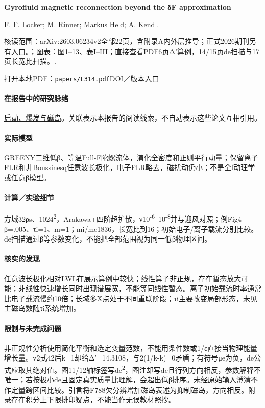 \textbf{Gyrofluid magnetic reconnection beyond the δF approximation}\citep{L314}\

F. F. Locker;  M. Rinner;  Markus Held;  A. Kendl.

\textsf{核读范围：}arXiv:2603.06234v2全部22页，含附录A内外层推导；正式2026期刊另有入口。；\textsf{图表：}图1–13、表I–III；直接查看PDF6页Δ'算例，14/15页de扫描与17页长宽比扫描。.

\href{run:papers/L314.pdf}{打开本地PDF：\texttt{papers/L314.pdf}}\quad\href{https://doi.org/10.1063/5.0332416}{DOI／版本入口}

\paragraph{在报告中的研究脉络}\hyperref[story:onset]{启动、爆发与磁岛}。关联表示本报告的阅读线索，不自动表示这些论文互相引用。

\paragraph{实际模型}GREENY二维低β、等温Full-F陀螺流体，演化全密度和正则平行动量；保留离子FLR和非Boussinesq任意波长极化，电子FLR略去，磁扰动仍小；不是全f动理学或任意β模型。

\paragraph{计算／实验细节}方域32ρs、1024\textsuperscript{2}，Arakawa+四阶超扩散，ν10\textsuperscript{-6}–10\textsuperscript{-8}并与迎风对照；例Fig4 β=.005、τi=1、m=1；mi/me1836，长宽比到16；初始电子/离子载流分别比较。de扫描通过β等参数变化，不能把全部范围视为同一低β物理区间。

\paragraph{核实的发现}任意波长极化相对LWL在展示算例中较快；线性算子非正规，存在暂态放大可能；非线性快速增长同时出现谱展宽，不能等同线性暂态。离子初始载流时率通常比电子载流慢约10倍；长域多X点处于不同重联阶段；τi主要改变局部形态，未见主磁岛数随τi系统增加。

\paragraph{限制与未完成问题}非正规性分析使用简化平衡和选定变量范数，不能用条件数或1/ε直接当物理能量增长量。v2式42后k=1却给Δ'=14.3108，与2(1/k-k)=0矛盾；有符号μe为负，de公式应取其绝对值。图11/12轴标签写de\textsuperscript{2}，图注却写de且行列方向相反，参数解释不唯一；若按极小de且固定真实质量比理解，会超出低β排序。未经原始输入澄清不作定量跨区间比较。引言将F788欠分辨增加磁岛表述为抑制磁岛，方向相反。附录存在积分上下限排印疑点，不能当作无误教材照抄。


